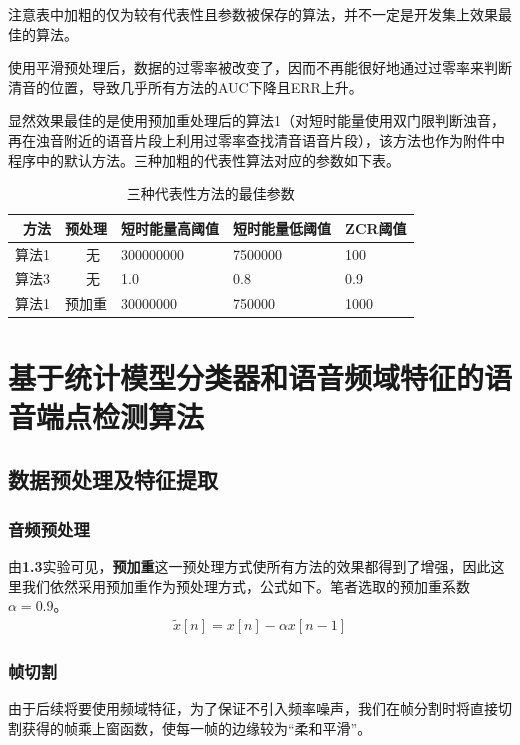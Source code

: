 \documentclass[a4paper]{article}
\begin{document}
\vspace{-1em}
注意表中加粗的仅为较有代表性且参数被保存的算法，并不一定是开发集上效果最佳的算法。

使用平滑预处理后，数据的过零率被改变了，因而不再能很好地通过过零率来判断清音的位置，导致几乎所有方法的AUC下降且ERR上升。

显然效果最佳的是使用预加重处理后的算法1（对短时能量使用双门限判断浊音，再在浊音附近的语音片段上利用过零率查找清音语音片段），该方法也作为附件中程序中的默认方法。三种加粗的代表性算法对应的参数如下表。

\begin{table}[th]
  \centering
  \begin{tabular}{ p{30pt} p{33pt} p{45pt} p{45pt} p{27pt} }
    \toprule
    \textbf{\ 方法} & \textbf{预处理} & \textbf{短时能量高阈值} & \textbf{短时能量低阈值} & \textbf{ZCR阈值} \\
    \midrule
    算法1 & \ \ \ 无 & 300000000 & 7500000 & 100 \\
    算法3 & \ \ \ 无 & 1.0 & 0.8 & 0.9 \\
    算法1 & 预加重 & 30000000 & 750000 & 1000 \\
    \bottomrule
  \end{tabular}
  \vspace{0.5em}
  \centering \caption{三种代表性方法的最佳参数}
  \label{tab2}
\end{table}

\section{基于统计模型分类器和语音频域特征的语音端点检测算法}

\subsection{数据预处理及特征提取}

\subsubsection{音频预处理}
    由\textbf{1.3}实验可见，\textbf{预加重}这一预处理方式使所有方法的效果都得到了增强，因此这里我们依然采用预加重作为预处理方式，公式如下。笔者选取的预加重系数$\alpha=0.9$。
    \begin{align*}
        \tilde{x}[n]=x[n] - \alpha x[n-1]
    \end{align*}
    
\subsubsection{帧切割}
    由于后续将要使用频域特征，为了保证不引入频率噪声，我们在帧分割时将直接切割获得的帧乘上窗函数，使每一帧的边缘较为“柔和平滑”。
    
\end{document}
